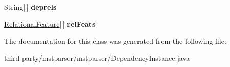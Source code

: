 \begin{DoxyCompactItemize}
\item 
\hypertarget{classmstparser_1_1DependencyInstance_a88377b95497507ae69f55a3d7cb675dd}{
String\mbox{[}$\,$\mbox{]} {\bfseries deprels}}
\label{classmstparser_1_1DependencyInstance_a88377b95497507ae69f55a3d7cb675dd}

\item 
\hypertarget{classmstparser_1_1DependencyInstance_aece2eac2fc007f74677d0f05357312b4}{
\hyperlink{classmstparser_1_1RelationalFeature}{RelationalFeature}\mbox{[}$\,$\mbox{]} {\bfseries relFeats}}
\label{classmstparser_1_1DependencyInstance_aece2eac2fc007f74677d0f05357312b4}

\end{DoxyCompactItemize}


The documentation for this class was generated from the following file:\begin{DoxyCompactItemize}
\item 
third-\/party/mstparser/mstparser/DependencyInstance.java\end{DoxyCompactItemize}
